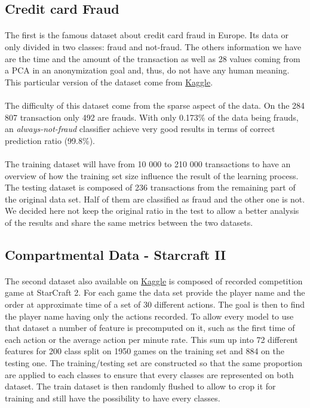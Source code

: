 \documentclass[twocolumn,a4paper,10pt]{article}
\begin{document}
\subsection{Credit card Fraud}
\paragraph{}
The first is the famous dataset about credit card fraud in Europe. Its data or only divided in two classes: fraud and not-fraud. The others information we have are the time and the amount of the transaction as well as 28 values coming from a PCA in an anonymization goal and, thus, do not have any human meaning. This particular version of the dataset come from \href{https://www.kaggle.com/dalpozz/creditcardfraud/}{Kaggle}.
\paragraph{}
The difficulty of this dataset come from the sparse aspect of the data. On the 284 807 transaction only 492 are frauds. With only 0.173\% of the data being frauds, an \textit{always-not-fraud} classifier achieve very good results in terms of correct prediction ratio (99.8\%).
\paragraph{}
The training dataset will have from 10 000 to 210 000 transactions to have an overview of how the training set size influence the result of the learning process. The testing dataset is composed of 236 transactions from the remaining part of the original data set. Half of them are classified as fraud and the other one is not. We decided here not keep the original ratio in the test to allow a better analysis of the results and share the same metrics between the two datasets.

\subsection{Compartmental Data - Starcraft II}
\paragraph{}
The second dataset also available on \href{https://www.kaggle.com/c/the-insa-starcraft-2-player-prediction-challenge/data}{Kaggle} is composed of recorded competition game at StarCraft 2. For each game the data set provide the player name and the order at approximate time of a set of 30 different actions. The goal is then to find the player name having only the actions recorded. To allow every model to use that dataset a number of feature is precomputed on it, such as the first time of each action or the average action per minute rate. This sum up into 72 different features for 200 class split on 1950 games on the training set and 884 on the testing one. The training/testing set are constructed so that the same proportion are applied to each classes to ensure that every classes are represented on both dataset. The train dataset is then randomly flushed to allow to crop it for training and still have the possibility to have every classes.
\end{document}
